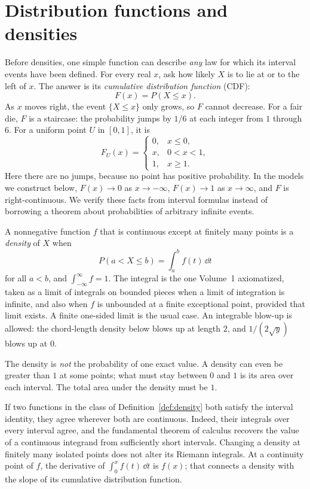 \section{Distribution functions and densities}

Before densities, one simple function can describe \emph{any} law for which its interval events have been defined. For every real $x$, ask how likely $X$ is to lie at or to the left of $x$. The answer is its \emph{cumulative distribution function} (CDF):
\[
 F(x)=P(X\le x).
\]
As $x$ moves right, the event $\{X\le x\}$ only grows, so $F$ cannot decrease. For a fair die, $F$ is a staircase: the probability jumps by $1/6$ at each integer from $1$ through $6$. For a uniform point $U$ in $[0,1]$, it is
\[
 F_U(x)=
 \begin{cases}
 0,&x\le0,\\
 x,&0<x<1,\\
 1,&x\ge1.
 \end{cases}
\]
Here there are no jumps, because no point has positive probability. In the models we construct below, $F(x)\to0$ as $x\to-\infty$, $F(x)\to1$ as $x\to\infty$, and $F$ is right-continuous. We verify these facts from interval formulas instead of borrowing a theorem about probabilities of arbitrary infinite events.

\begin{definition}[density]\label{def:density}
A nonnegative function $f$ that is continuous except at finitely many points is a \emph{density} of $X$ when
\[
 P(a<X\le b)=\int_a^b f(t)\,\dd t
\]
for all $a<b$, and $\int_{-\infty}^{\infty}f=1$. The integral is the one Volume~1 axiomatized, taken as a limit of integrals on bounded pieces when a limit of integration is infinite, and also when $f$ is unbounded at a finite exceptional point, provided that limit exists. A finite one-sided limit is the usual case. An integrable blow-up is allowed: the chord-length density below blows up at length $2$, and $1/(2\sqrt y)$ blows up at $0$.
\end{definition}

The density is \emph{not} the probability of one exact value. A density can even be greater than $1$ at some points; what must stay between $0$ and $1$ is its area over each interval. The total area under the density must be $1$.

If two functions in the class of Definition~\ref{def:density} both satisfy the interval identity, they agree wherever both are continuous. Indeed, their integrals over every interval agree, and the fundamental theorem of calculus recovers the value of a continuous integrand from sufficiently short intervals. Changing a density at finitely many isolated points does not alter its Riemann integrals. At a continuity point of $f$, the derivative of $\int_0^x f(t)\,\dd t$ is $f(x)$; that connects a density with the slope of its cumulative distribution function.


